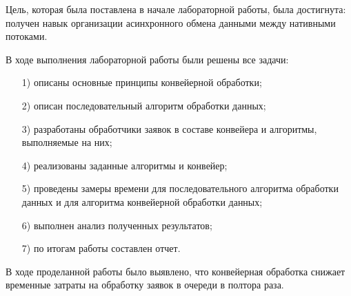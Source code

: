 
Цель, которая была поставлена в начале лабораторной работы, была достигнута: получен навык организации асинхронного обмена данными между нативными потоками.

В ходе выполнения лабораторной работы были решены все задачи:
\begin{enumerate}[itemindent=1.25em]
	\item[1)] описаны основные принципы конвейерной обработки;
\item[2)] описан последовательный алгоритм обработки данных;
\item[3)]
разработаны обработчики заявок в составе конвейера и алгоритмы, выполняемые на них;
\item[4)] реализованы заданные алгоритмы и конвейер;
\item[5)] проведены замеры времени для последовательного алгоритма обработки данных и для алгоритма конвейерной обработки данных;%
\item[6)] выполнен анализ полученных результатов;
\item[7)] по итогам работы составлен отчет.
\end{enumerate}


В ходе проделанной работы было выявлено, что конвейерная обработка снижает временные затраты на обработку заявок в очереди в полтора раза. 